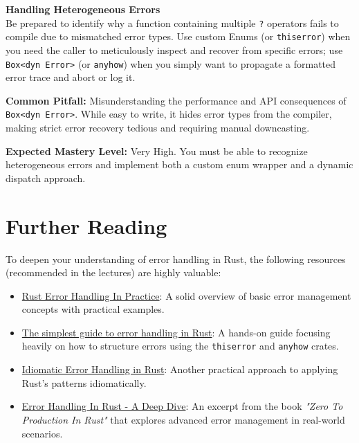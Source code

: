 \begin{examprioritybox}
\textbf{Handling Heterogeneous Errors}\\
Be prepared to identify why a function containing multiple \texttt{?} operators fails to compile due to mismatched error types. Use custom Enums (or \texttt{thiserror}) when you need the caller to meticulously inspect and recover from specific errors; use \texttt{Box<dyn Error>} (or \texttt{anyhow}) when you simply want to propagate a formatted error trace and abort or log it.

\textbf{Common Pitfall:} Misunderstanding the performance and API consequences of \texttt{Box<dyn Error>}. While easy to write, it hides error types from the compiler, making strict error recovery tedious and requiring manual downcasting.

\textbf{Expected Mastery Level:} Very High. You must be able to recognize heterogeneous errors and implement both a custom enum wrapper and a dynamic dispatch approach.
\end{examprioritybox}

\section*{Further Reading}

To deepen your understanding of error handling in Rust, the following resources (recommended in the lectures) are highly valuable:
\begin{itemize}
    \item \href{https://medium.com/coinmonks/rust-error-handling-in-practice-376d86ba12ca}{Rust Error Handling In Practice}: A solid overview of basic error management concepts with practical examples.
    \item \href{https://kerkour.com/rust-error-handling}{The simplest guide to error handling in Rust}: A hands-on guide focusing heavily on how to structure errors using the \texttt{thiserror} and \texttt{anyhow} crates.
    \item \href{https://www.learnrust.blog/p/idiomatic-error-handling-in-rust}{Idiomatic Error Handling in Rust}: Another practical approach to applying Rust's patterns idiomatically.
    \item \href{https://www.lpalmieri.com/posts/error-handling-rust/}{Error Handling In Rust - A Deep Dive}: An excerpt from the book \textit{"Zero To Production In Rust"} that explores advanced error management in real-world scenarios.
\end{itemize}



